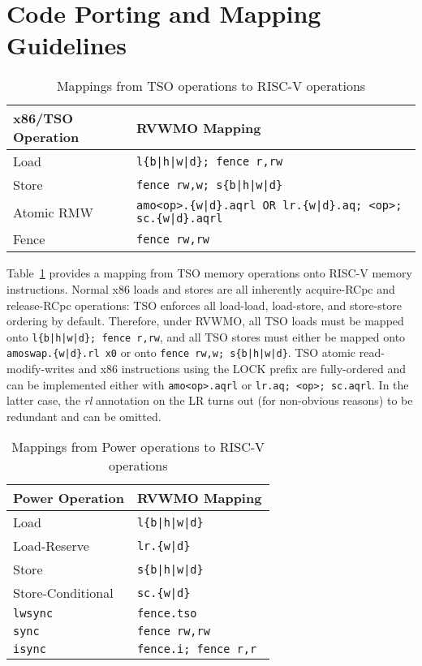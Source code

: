 \section{Code Porting and Mapping Guidelines}
\label{sec:porting}

\begin{table}[h!]
  \centering
  \begin{tabular}{|l|l|}
    \hline
    x86/TSO Operation & RVWMO Mapping \\
    \hline
    \hline
    Load              & \tt l\{b|h|w|d\}; fence r,rw               \\
    \hline
    Store             & \tt fence rw,w; s\{b|h|w|d\}               \\
    \hline
    Atomic RMW        & \tt amo<op>.\{w|d\}.aqrl \textrm{OR} lr.\{w|d\}.aq; <op>; sc.\{w|d\}.aqrl \\
    \hline
    Fence             & \tt fence rw,rw \\
    \hline
  \end{tabular}
  \caption{Mappings from TSO operations to RISC-V operations}
  \label{tab:tsomappings}
\end{table}

Table~\ref{tab:tsomappings} provides a mapping from TSO memory operations onto RISC-V memory instructions.
Normal x86 loads and stores are all inherently acquire-RCpc and release-RCpc operations: TSO enforces all load-load, load-store, and store-store ordering by default.
Therefore, under RVWMO, all TSO loads must be mapped onto {\tt l\{b|h|w|d\}; fence r,rw}, and all TSO stores must either be mapped onto {\tt amoswap.\{w|d\}.rl~x0} or onto {\tt fence rw,w; s\{b|h|w|d\}}.
TSO atomic read-modify-writes and x86 instructions using the LOCK prefix are fully-ordered and can be implemented either with {\tt amo<op>.aqrl} or {\tt lr.aq; <op>; sc.aqrl}.
In the latter case, the {\em rl} annotation on the LR turns out (for non-obvious reasons) to be redundant and can be omitted.

\begin{table}[h!]
  \centering
  \begin{tabular}{|l|l|}
    \hline
    Power Operation & RVWMO Mapping \\
    \hline
    \hline
    Load              & \tt l\{b|h|w|d\}  \\
    \hline
    Load-Reserve      & \tt lr.\{w|d\}  \\
    \hline
    Store             & \tt s\{b|h|w|d\}  \\
    \hline
    Store-Conditional & \tt sc.\{w|d\}  \\
    \hline
    \tt lwsync        & \tt fence.tso \\
    \hline
    \tt sync          & \tt fence rw,rw \\
    \hline
    \tt isync         & \tt fence.i; fence r,r \\
    \hline
  \end{tabular}
  \caption{Mappings from Power operations to RISC-V operations}
  \label{tab:powermappings}
\end{table}

